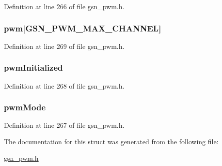 Definition at line 266 of file gsn\_\-pwm.h.

\hypertarget{a00182_affa137db63d2e4919928e2d76ade5f71}{
\subsubsection[{pwm}]{ {\bf pwm}\mbox{[}GSN\_\-PWM\_\-MAX\_\-CHANNEL\mbox{]}}}
\label{a00182_affa137db63d2e4919928e2d76ade5f71}


Definition at line 269 of file gsn\_\-pwm.h.

\hypertarget{a00182_a8b5041b6996ce36cbca91c0a16985da0}{
\subsubsection[{pwmInitialized}]{ {\bf pwmInitialized}}}
\label{a00182_a8b5041b6996ce36cbca91c0a16985da0}


Definition at line 268 of file gsn\_\-pwm.h.

\hypertarget{a00182_a8f5b60bc2e72b9a19cf8f4a991ac4327}{
\subsubsection[{pwmMode}]{ {\bf pwmMode}}}
\label{a00182_a8f5b60bc2e72b9a19cf8f4a991ac4327}


Definition at line 267 of file gsn\_\-pwm.h.



The documentation for this struct was generated from the following file:\begin{DoxyCompactItemize}
\item 
\hyperlink{a00540}{gsn\_\-pwm.h}\end{DoxyCompactItemize}
